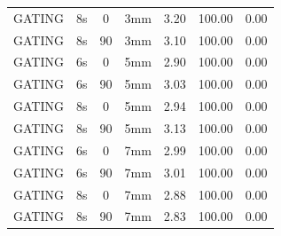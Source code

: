 \documentclass[type=dr, dr=rernat, accentcolor=tud7b,colorbacktitle, bigchapter, openright, twoside, 12pt ]{tudthesis}
\begin{document}
\begin{table}[H]
\begin{tabular}{|c||c|c|c||c|c|c|}
GATING & 8s & 0 & 3mm & 3.20 & 100.00 & 0.00 \\
GATING & 8s & 90 & 3mm & 3.10 & 100.00 & 0.00 \\
GATING & 6s & 0 & 5mm & 2.90 & 100.00 & 0.00 \\
GATING & 6s & 90 & 5mm & 3.03 & 100.00 & 0.00 \\
GATING & 8s & 0 & 5mm & 2.94 & 100.00 & 0.00 \\
GATING & 8s & 90 & 5mm & 3.13 & 100.00 & 0.00 \\
GATING & 6s & 0 & 7mm & 2.99 & 100.00 & 0.00 \\
GATING & 6s & 90 & 7mm & 3.01 & 100.00 & 0.00 \\
GATING & 8s & 0 & 7mm & 2.88 & 100.00 & 0.00 \\
GATING & 8s & 90 & 7mm & 2.83 & 100.00 & 0.00 \\
    \hline\hline 
  \end{tabular}
\end{table}

\newpage
\end{document}
